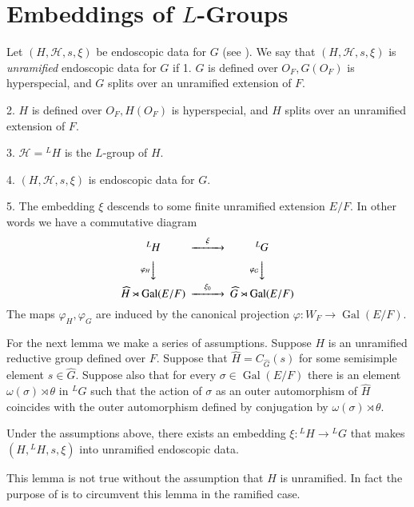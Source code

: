 \documentclass{amsart}
\newenvironment{cthm}[1]
  {\renewcommand\thethm{\bf #1}\thm}
  {\endthm}
\def\Gal{\operatorname{\text{Gal}}}          %
\def\LANGLANDSO{21}
\def\LANGLANDSCAN{20}
\begin{document}
\section{Embeddings of $L$-Groups} %

Let $(H,\mathcal{ H},s,\xi)$ be endoscopic data for $G$
(see \cite{\LANGLANDSO}).  
We say that $(H,\mathcal{ H},s,\xi)$ is {\it unramified }
endoscopic data for $G$ if 
{1.}  $G$ is defined over $O_F,G(O_F)$ is hyperspecial,
and $G$ splits over an unramified extension of $F$.

{2.}  $H$ is defined over $O_F,H(O_F)$ is hyperspecial,
and $H$ splits over an unramified extension of $F$.

{3.}  $\mathcal{ H}={}^LH$ is the $L$-group of $H$.

{4.}  $(H,\mathcal{ H},s,\xi)$ is endoscopic data for $G$.

{5.}  The embedding $\xi$ descends to some finite unramified
extension $E/F$.  
In other words we have a commutative diagram
$$
\begin{CD}
{}^LH @>\xi>> {}^LG\\
@V\varphi_H VV    @V\varphi_GVV\\
\widehat H\rtimes\Gal(E/F) @>{\xi_0}>> 
\widehat G\rtimes \Gal(E/F)
\end{CD}
$$
The maps $\varphi_H,\varphi_G$ are induced by the canonical projection
$\varphi:W_F\to \Gal(E/F)$.

For the next lemma we make a series of assumptions.
Suppose $H$ is an unramified reductive group defined over $F$.
Suppose that 
$\widehat H=C_{\widehat G}(s)$ for some semisimple element
$s\in\widehat G$.  Suppose also that for every $\sigma\in \Gal(E/F)$ there
is an element $\omega(\sigma)\rtimes\theta$ in ${}^LG$ such that the action
of $\sigma$ as an outer automorphism of $\widehat H$ coincides with the
outer automorphism defined by conjugation by $\omega(\sigma)\rtimes\theta$.

\begin{cthm}{Lemma 6.1}  Under the assumptions above, there exists an embedding
$\xi:{}^LH\to{}^LG$ that makes $(H,{}^LH,s,\xi)$ into
unramified endoscopic data.
\end{cthm}

\begin{cthm}{Remark}  This lemma is not true without the assumption that $H$ is
unramified.  In fact the purpose of \cite{\LANGLANDSCAN} is to circumvent
this lemma in the ramified case.
\end{cthm}
\end{document}
